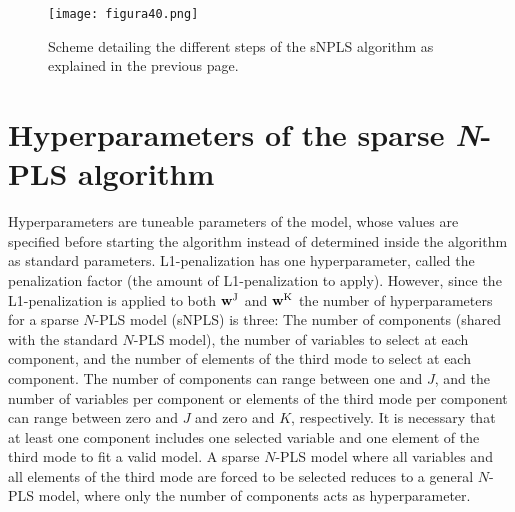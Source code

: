 \begin{figure}[hbtp]
\centering
\texttt{[image: figura40.png]}
\caption{Scheme detailing the different steps of the sNPLS algorithm as explained in the previous page. \vspace{15pt}}
\label{figura40}
\end{figure}



\section{Hyperparameters of the sparse \textit{N}-PLS algorithm}
\label{hyperparameters}
Hyperparameters are tuneable parameters of the model, whose values are specified before starting the algorithm instead of determined inside the algorithm as standard parameters. L1-penalization has one hyperparameter, called the penalization factor (the amount of L1-penalization to apply). However, since the L1-penalization is applied to both $\textbf{\text{w}}^\text{J}$ and $\textbf{\text{w}}^\text{K}$ the number of hyperparameters for a sparse $N$-PLS model (sNPLS) is three: The number of components (shared with the standard $N$-PLS model), the number of variables to select at each component, and the number of elements of the third mode to select at each component. The number of components can range between one and $J$, and the number of variables per component or elements of the third mode per component can range between zero and $J$ and zero and $K$, respectively. It is necessary that at least one component includes one selected variable and one element of the third mode to fit a valid model. A sparse $N$-PLS model where all variables and all elements of the third mode are forced to be selected reduces to a general $N$-PLS model, where only the number of components acts as hyperparameter.

